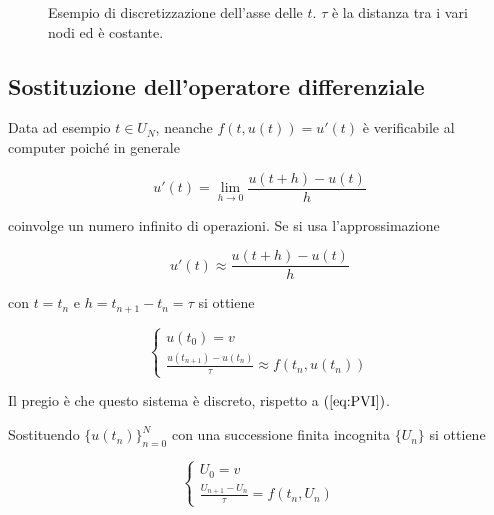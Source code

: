 \documentclass[hidelinks, 10pt]{report}
\begin{document}
\begin{figure}[H]
\begin{center}

\caption{Esempio di discretizzazione dell'asse delle $ t $. $ \tau $ \`e la distanza tra i vari nodi ed \`e costante.}
\end{center}
\end{figure}

\subsection{Sostituzione dell'operatore differenziale}
Data ad esempio $ t \in U_{N} $, neanche $ f \left( t, u(t) \right) = u'(t) $ \`e verificabile al computer poich\'e in generale

\[ u'(t) = \lim\limits_{h \to 0} \frac{u(t + h) - u(t)}{h} \]

coinvolge un numero infinito di operazioni. Se si usa l'approssimazione

\[ u'(t) \approx \frac{u(t + h) - u(t)}{h} \]

con $ t = t_{n} $ e $ h = t_{n + 1} - t_{n} = \tau $ si ottiene

\[
\begin{cases}
u(t_{0}) = v \\
\frac{u(t_{n + 1}) - u(t_{n})}{\tau} \approx f \left( t_{n}, u(t_{n}) \right)
\end{cases}
\]

Il pregio \`e che questo sistema \`e discreto, rispetto a $ (\ref{eq:PVI}) $.

Sostituendo $ \{ u(t_{n}) \}_{n = 0}^{N} $ con una successione finita incognita $ \{ U_{n} \} $ si ottiene

\begin{equation}	\label{eq:EE}
\begin{cases}
U_{0} = v \\
\frac{U_{n + 1} - U_{n}}{\tau} = f(t_{n}, U_{n})
\end{cases}
\end{equation}
\end{document}

